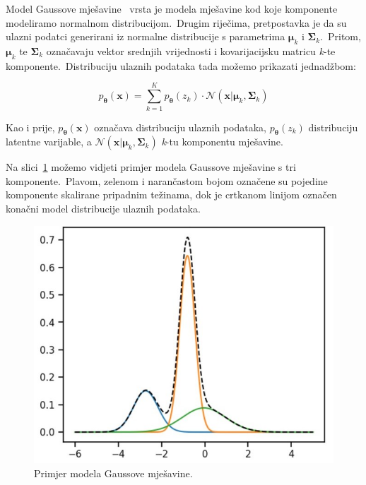 \documentclass[times, utf8, seminar, numeric]{fer}
\begin{document}
Model Gaussove mješavine~\cite{reynolds2009gaussian} vrsta je modela mješavine kod koje komponente modeliramo normalnom distribucijom.\
Drugim riječima, pretpostavka je da su ulazni podatci generirani iz normalne distribucije s parametrima $\bm{\mu}_k$ i $\bm{\Sigma}_k$.\ 
Pritom, $\bm{\mu}_k$ te $\bm{\Sigma}_k$ označavaju vektor srednjih vrijednosti i kovarijacijsku matricu \textit{k}-te komponente.\
Distribuciju ulaznih podataka tada možemo prikazati jednadžbom:

\begin{equation}
    p_{\bm{\theta}}(\bm{x}) = \sum_{k=1}^{K} p_{\bm{\theta}}(z_k) \cdot \mathcal{N}(\bm{x}|\bm{\mu}_k, \bm{\Sigma}_k)
    \label{eq:gaussian_mixture_model}
\end{equation}

Kao i prije, $p_{\bm{\theta}}(\bm{x})$ označava distribuciju ulaznih podataka, $p_{\bm{\theta}}(z_k)$ distribuciju latentne varijable, a $\mathcal{N}(\bm{x}|\bm{\mu}_k, \bm{\Sigma}_k)$ \textit{k}-tu komponentu mješavine.\ 
  
Na slici~\ref{fig:GMM} možemo vidjeti primjer modela Gaussove mješavine s tri komponente.\ Plavom, zelenom i narančastom bojom označene su pojedine komponente skalirane pripadnim težinama, dok je crtkanom linijom označen konačni model distribucije ulaznih podataka.\

\begin{figure}[h]
    \centering
    \includegraphics[scale=1]{./Slike/GMM.jpg}
    \caption{Primjer modela Gaussove mješavine.}
    \label{fig:GMM}
\end{figure}
\end{document}
